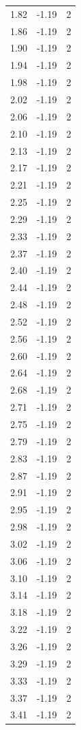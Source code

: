 \begin{longtable}{lrr}
  1.82 & -1.19 & 2 \\
  1.86 & -1.19 & 2 \\
  1.90 & -1.19 & 2 \\
  1.94 & -1.19 & 2 \\
  1.98 & -1.19 & 2 \\
  2.02 & -1.19 & 2 \\
  2.06 & -1.19 & 2 \\
  2.10 & -1.19 & 2 \\
  2.13 & -1.19 & 2 \\
  2.17 & -1.19 & 2 \\
  2.21 & -1.19 & 2 \\
  2.25 & -1.19 & 2 \\
  2.29 & -1.19 & 2 \\
  2.33 & -1.19 & 2 \\
  2.37 & -1.19 & 2 \\
  2.40 & -1.19 & 2 \\
  2.44 & -1.19 & 2 \\
  2.48 & -1.19 & 2 \\
  2.52 & -1.19 & 2 \\
  2.56 & -1.19 & 2 \\
  2.60 & -1.19 & 2 \\
  2.64 & -1.19 & 2 \\
  2.68 & -1.19 & 2 \\
  2.71 & -1.19 & 2 \\
  2.75 & -1.19 & 2 \\
  2.79 & -1.19 & 2 \\
  2.83 & -1.19 & 2 \\
  2.87 & -1.19 & 2 \\
  2.91 & -1.19 & 2 \\
  2.95 & -1.19 & 2 \\
  2.98 & -1.19 & 2 \\
  3.02 & -1.19 & 2 \\
  3.06 & -1.19 & 2 \\
  3.10 & -1.19 & 2 \\
  3.14 & -1.19 & 2 \\
  3.18 & -1.19 & 2 \\
  3.22 & -1.19 & 2 \\
  3.26 & -1.19 & 2 \\
  3.29 & -1.19 & 2 \\
  3.33 & -1.19 & 2 \\
  3.37 & -1.19 & 2 \\
  3.41 & -1.19 & 2 \\

\end{longtable}
